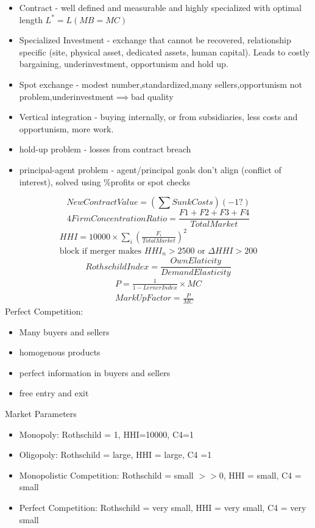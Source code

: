 \documentclass[nobib,fleqn,8pt]{article}
\begin{document}
\begin{itemize}
    \item Contract - well defined and measurable and highly specialized with optimal
          length $L^* = L(MB=MC)$
    \item Specialized Investment - exchange that cannot be recovered, relationship
          specific (site, physical asset, dedicated assets, human capital). Leads to
          costly bargaining, underinvestment, opportunism and hold up.
    \item Spot exchange - modest number,standardized,many sellers,opportunism not
          problem,underinvestment$\implies$bad quality
    \item Vertical integration - buying internally, or from subsidiaries, less costs and
          opportunism, more work.
    \item hold-up problem - losses from contract breach
    \item principal-agent problem - agent/principal goals don't align (conflict of
          interest), solved using \%profits or spot checks
\end{itemize}
\begin{equation*}
    NewContractValue = (\sum SunkCosts) (-1?)
\end{equation*}
\begin{equation*}
    4FirmConcentrationRatio = \frac{F1+F2+F3+F4}{TotalMarket}
\end{equation*}
\begin{eqnarray*}
    HHI = 10000\times\sum_i\left(\frac{F_i}{TotalMarket}\right)^2 \\
    \text{block if merger makes $HHI_n>2500$ or $\Delta HHI > 200$}
\end{eqnarray*}
\begin{equation*}
    RothschildIndex = \frac{OwnElaticity}{DemandElasticity}
\end{equation*}
\begin{eqnarray*}
    P = \frac{1}{1-LernerIndex}\times MC\\
    MarkUpFactor = \frac{P}{MC}
\end{eqnarray*}
Perfect Competition:
\begin{itemize}
    \item Many buyers and sellers
    \item homogenous products
    \item perfect information in buyers and sellers
    \item free entry and exit
\end{itemize}
Market Parameters
\begin{itemize}
    \item Monopoly: Rothschild = 1, HHI=10000, C4=1
    \item Oligopoly: Rothschild = large, HHI = large, C4 =1
    \item Monopolistic Competition: Rothschild = small $>>0$, HHI = small, C4 = small
    \item Perfect Competition: Rothschild = very small, HHI = very small, C4 = very small
\end{itemize}
\end{document}
